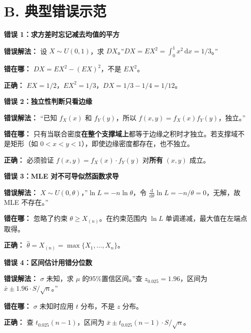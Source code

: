 ﻿\documentclass[lang=cn,11pt]{elegantbook}
\begin{document}
\section*{B. 典型错误示范}

\begin{note}
\textbf{错误 1：求方差时忘记减去均值的平方}

\textbf{错误解法：} 设 $X\sim U(0,1)$，求 $DX$。”$DX=EX^2=\int_0^1 x^2\,\mathrm{d}x=1/3$。”

\textbf{错在哪：} $DX=EX^2-(EX)^2$，不是 $EX^2$。

\textbf{正确：} $EX=1/2$，$EX^2=1/3$，$DX=1/3-1/4=1/12$。
\end{note}

\begin{note}
\textbf{错误 2：独立性判断只看边缘}

\textbf{错误解法：} “已知 $f_X(x)$ 和 $f_Y(y)$，所以 $f(x,y)=f_X(x)f_Y(y)$，独立。”

\textbf{错在哪：} 只有当联合密度\textbf{在整个支撑域上}都等于边缘之积时才独立。若支撑域不是矩形（如 $0<x<y<1$），即使边缘密度都存在，也不独立。

\textbf{正确：} 必须验证 $f(x,y)=f_X(x)\cdot f_Y(y)$ 对\textbf{所有} $(x,y)$ 成立。
\end{note}

\begin{note}
\textbf{错误 3：MLE 对不可导似然函数求导}

\textbf{错误解法：} $X\sim U(0,\theta)$，”$\ln L=-n\ln\theta$，令 $\frac{\mathrm{d}}{\mathrm{d}\theta}\ln L=-n/\theta=0$，无解，故 MLE 不存在。”

\textbf{错在哪：} 忽略了约束 $\theta\geq X_{(n)}$。在约束范围内 $\ln L$ 单调递减，最大值在左端点取得。

\textbf{正确：} $\hat\theta=X_{(n)}=\max\{X_1,\dots,X_n\}$。
\end{note}

\begin{note}
\textbf{错误 4：区间估计用错分位数}

\textbf{错误解法：} $\sigma$ 未知，求 $\mu$ 的95\%置信区间。”查 $z_{0.025}=1.96$，区间为 $\bar x\pm 1.96\cdot S/\sqrt{n}$。”

\textbf{错在哪：} $\sigma$ 未知时应用 $t$ 分布，不是 $z$ 分布。

\textbf{正确：} 查 $t_{0.025}(n-1)$，区间为 $\bar x\pm t_{0.025}(n-1)\cdot S/\sqrt{n}$。
\end{note}
\end{document}
